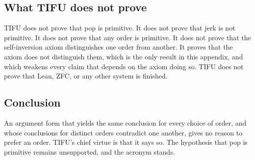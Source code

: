 \documentclass[11pt]{article}
\begin{document}
\subsection{What TIFU does not prove}

TIFU does not prove that pop is primitive. It does not prove that jerk is not primitive. It does not prove that any order is primitive. It does not prove that the self-inversion axiom distinguishes one order from another. It proves that the axiom does not distinguish them, which is the only result in this appendix, and which weakens every claim that depends on the axiom doing so. TIFU does not prove that Lean, ZFC, or any other system is finished.

\subsection{Conclusion}

An argument form that yields the same conclusion for every choice of order, and whose conclusions for distinct orders contradict one another, gives no reason to prefer an order. TIFU's chief virtue is that it says so. The hypothesis that pop is primitive remains unsupported, and the acronym stands.
\end{document}
